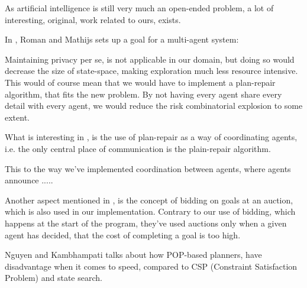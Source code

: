 \documentclass[Main]{subfiles}
\begin{document}
As artificial intelligence is still very much an open-ended problem, a lot of interesting, original, work related to ours, exists.

In \cite{VanderKrogt2005}, Roman and Mathijs sets up a goal for a multi-agent system:

Maintaining privacy per se, is not applicable in our domain, but doing so would decrease the size of state-space, 
making exploration much less resource intensive. 
This would of course mean that we would have to implement a plan-repair algorithm, that fits the new problem.
By not having every agent share every detail with every agent, we would reduce the risk combinatorial explosion to some extent.

What is interesting in \cite{VanderKrogt2005}, is the use of plan-repair as a way of coordinating agents, i.e. the only central place of communication is the plain-repair algorithm.

This  to the way we've implemented coordination between agents, where agents announce ..... 

Another aspect mentioned in \cite{VanderKrogt2005}, is the concept of bidding on goals at an auction, which is also used in our implementation.
Contrary to our use of bidding, which happens at the start of the program, they've used auctions only when a given agent has decided, that the cost of completing a goal is too high.

Nguyen and Kambhampati \cite{Nguyen2001} talks about how POP-based planners, have disadvantage when it comes to speed, compared to CSP (Constraint Satisfaction Problem) and state search.
\end{document}

